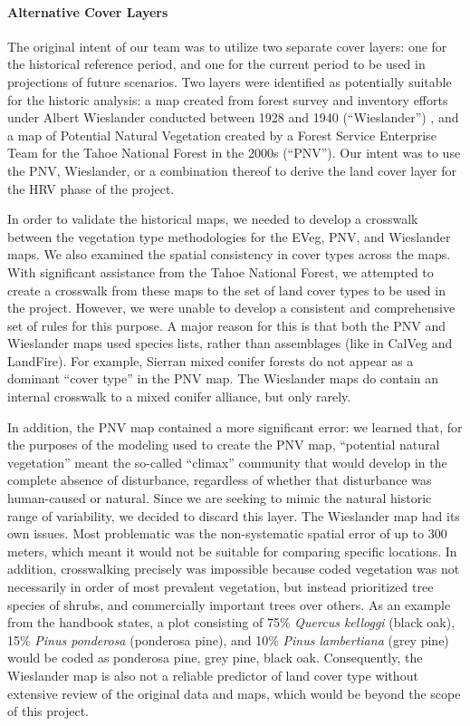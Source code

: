 \paragraph{Alternative Cover Layers}
The original intent of our team was to utilize two separate cover layers: one for the historical reference period, and one for the current period to be used in projections of future scenarios. Two layers were identified as potentially suitable for the historic analysis: a map created from forest survey and inventory efforts under Albert Wieslander conducted between 1928 and 1940 (``Wieslander'') , and a map of Potential Natural Vegetation created by a Forest Service Enterprise Team for the Tahoe National Forest in the 2000s (``PNV''). Our intent was to use the PNV, Wieslander, or a combination thereof to derive the land cover layer for the HRV phase of the project. 

In order to validate the historical maps, we needed to develop a crosswalk between the vegetation type methodologies for the EVeg, PNV, and Wieslander maps. We also examined the spatial consistency in cover types across the maps. With significant assistance from the Tahoe National Forest, we attempted to create a crosswalk from these maps to the set of land cover types to be used in the project. However, we were unable to develop a consistent and comprehensive set of rules for this purpose. A major reason for this is that both the PNV and Wieslander maps used species lists, rather than assemblages (like in CalVeg and LandFire). For example, Sierran mixed conifer forests do not appear as a dominant ``cover type'' in the PNV map. The Wieslander maps do contain an internal crosswalk to a mixed conifer alliance, but only rarely. 

In addition, the PNV map contained a more significant error: we learned that, for the purposes of the modeling used to create the PNV map, ``potential natural vegetation'' meant the so-called ``climax'' community that would develop in the complete absence of disturbance, regardless of whether that disturbance was human-caused or natural. Since we are seeking to mimic the natural historic range of variability, we decided to discard this layer. The Wieslander map had its own issues. Most problematic was the non-systematic spatial error of up to 300 meters, which meant it would not be suitable for comparing specific locations. In addition, crosswalking precisely was impossible because coded vegetation was not necessarily in order of most prevalent vegetation, but instead prioritized tree species of shrubs, and commercially important trees over others. As an example from the handbook states, a plot consisting of 75\% \emph{Quercus kelloggi} (black oak), 15\% \emph{Pinus ponderosa} (ponderosa pine), and 10\% \emph{Pinus lambertiana} (grey pine) would be coded as ponderosa pine, grey pine, black oak. Consequently, the Wieslander map is also not a reliable predictor of land cover type without extensive review of the original data and maps, which would be beyond the scope of this project. 

